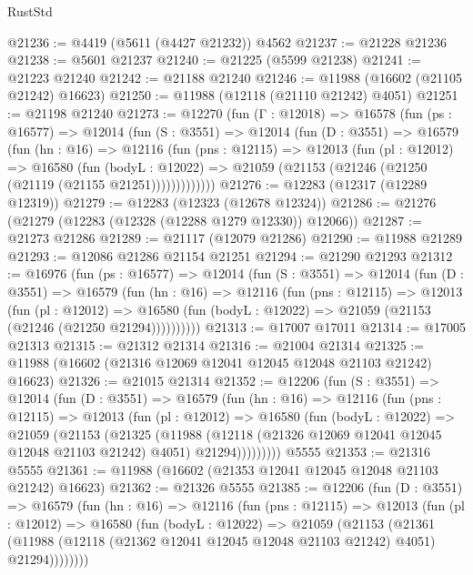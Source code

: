 \begin{lexlean}{RustStd}
\begin{coremodule}
@21236 := @4419 (@5611 (@4427 @21232)) @4562
@21237 := @21228 @21236
@21238 := @5601 @21237
@21240 := @21225 (@5599 @21238)
@21241 := @21223 @21240
@21242 := @21188 @21240
@21246 := @11988 (@16602 (@21105 @21242) @16623)
@21250 := @11988 (@12118 (@21110 @21242) @4051)
@21251 := @21198 @21240
@21273 := @12270
    (fun (Γ : @12018) =>
    @16578
      (fun (ps : @16577) =>
      @12014
        (fun (S : @3551) =>
        @12014
          (fun (D : @3551) =>
          @16579
            (fun (hn : @16) =>
            @12116
              (fun (pns : @12115) =>
              @12013
                (fun (pl : @12012) =>
                @16580
                  (fun (bodyL : @12022) =>
                  @21059 (@21153 (@21246 (@21250 (@21119 (@21155 @21251)))))))))))))
@21276 := @12283 (@12317 (@12289 @12319))
@21279 := @12283 (@12323 (@12678 @12324))
@21286 := @21276 (@21279 (@12283 (@12328 (@12288 @1279 @12330)) @12066))
@21287 := @21273 @21286
@21289 := @21117 (@12079 @21286)
@21290 := @11988 @21289
@21293 := @12086 @21286 @21154 @21251
@21294 := @21290 @21293
@21312 := @16976
    (fun (ps : @16577) =>
    @12014
      (fun (S : @3551) =>
      @12014
        (fun (D : @3551) =>
        @16579
          (fun (hn : @16) =>
          @12116
            (fun (pns : @12115) =>
            @12013
              (fun (pl : @12012) =>
              @16580 (fun (bodyL : @12022) => @21059 (@21153 (@21246 (@21250 @21294))))))))))
@21313 := @17007 @17011
@21314 := @17005 @21313
@21315 := @21312 @21314
@21316 := @21004 @21314
@21325 := @11988 (@16602 (@21316 @12069 @12041 @12045 @12048 @21103 @21242) @16623)
@21326 := @21015 @21314
@21352 := @12206
    (fun (S : @3551) =>
    @12014
      (fun (D : @3551) =>
      @16579
        (fun (hn : @16) =>
        @12116
          (fun (pns : @12115) =>
          @12013
            (fun (pl : @12012) =>
            @16580
              (fun (bodyL : @12022) =>
              @21059
                (@21153
                  (@21325
                    (@11988
                      (@12118 (@21326 @12069 @12041 @12045 @12048 @21103 @21242) @4051)
                      @21294)))))))))
    @5555
@21353 := @21316 @5555
@21361 := @11988 (@16602 (@21353 @12041 @12045 @12048 @21103 @21242) @16623)
@21362 := @21326 @5555
@21385 := @12206
    (fun (D : @3551) =>
    @16579
      (fun (hn : @16) =>
      @12116
        (fun (pns : @12115) =>
        @12013
          (fun (pl : @12012) =>
          @16580
            (fun (bodyL : @12022) =>
            @21059
              (@21153
                (@21361
                  (@11988 (@12118 (@21362 @12041 @12045 @12048 @21103 @21242) @4051) @21294))))))))

\end{coremodule}
\end{lexlean}
